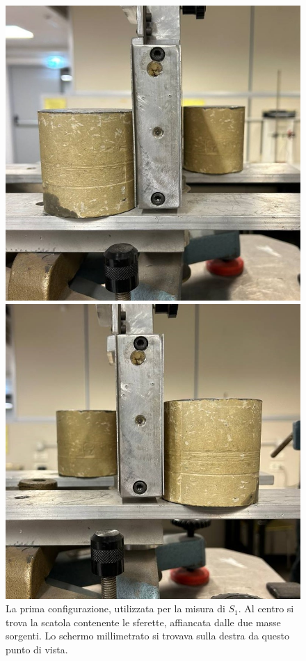 \documentclass{article}
\begin{document}
\begin{figure}[h!]
    \centering
    \begin{minipage}[t]{0.45\textwidth}
        \centering
        \includegraphics[width=\textwidth]{images/config_1.jpg}
        \caption{La prima configurazione, utilizzata per la misura di $S_1$. Al centro si trova la scatola contenente le sferette, affiancata dalle due masse sorgenti. Lo schermo millimetrato si trovava sulla destra da questo punto di vista.}
        \label{fig:config_1}
    \end{minipage}\hfill
    \begin{minipage}[t]{0.45\textwidth}
        \centering
        \includegraphics[width=\textwidth]{images/config_2.jpg}

\end{minipage}
\end{figure}
\end{document}
